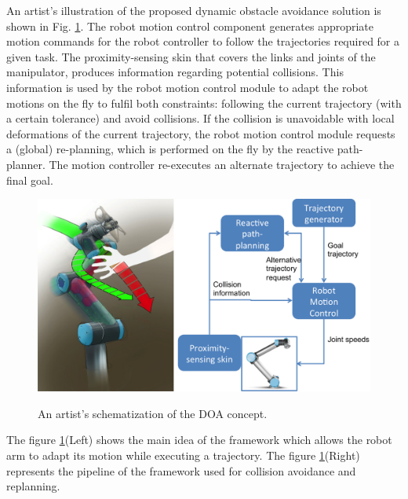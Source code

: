 An artist's illustration of the proposed dynamic obstacle avoidance solution is shown in Fig. \ref{fig:overview}. The robot motion control component generates appropriate motion commands for the robot controller to follow the trajectories required for a given task. The proximity-sensing skin that covers the links and joints of the manipulator, produces information regarding potential collisions. This information is used by the robot motion control module to adapt the robot motions on the fly to fulfil both constraints: following the current trajectory (with a certain tolerance) and avoid collisions. If the collision is unavoidable with local deformations of the current trajectory, the robot motion control module requests a (global) re-planning,
which is performed on the fly by the reactive path-planner. The motion controller re-executes an alternate trajectory to achieve the final goal.
\begin{figure}[h]
\centering
{\includegraphics[scale=0.5]{chapters/doa/images/overview.png}}
\caption[0.1\textwidth]{An artist's schematization of the DOA
concept.}
\label{fig:overview}
\end{figure}
The figure \ref{fig:overview}(Left) shows the main idea of the framework which allows the robot arm to adapt its motion while executing a trajectory. The figure \ref{fig:overview}(Right) represents the pipeline of the framework used for collision avoidance and replanning. 

